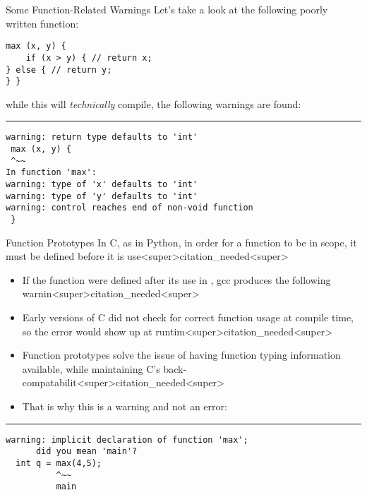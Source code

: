 \documentclass[11pt]{beamer}
\let\OldTexttt\texttt
\renewcommand{\texttt}[1]{\OldTexttt{\color{teal}{#1}}}
\begin{document}
\begin{frame}[fragile=singleslide]{Some Function-Related Warnings}
Let's take a look at the following poorly written function:
\begin{lstlisting}[style=C]
max (x, y) {
	if (x > y) { // return x;
} else { // return y; 
} }
\end{lstlisting}
while this will \emph{technically} compile, the following warnings are found:
\hrule\small
\begin{lstlisting}[style=terminal]
warning: return type defaults to 'int' 
 max (x, y) {
 ^~~
In function 'max':
warning: type of 'x' defaults to 'int' 
warning: type of 'y' defaults to 'int' 
warning: control reaches end of non-void function 
 }
\end{lstlisting}
\end{frame}

\begin{frame}[fragile=singleslide]{Function Prototypes}
In C, as in Python, in order for a function to be in scope, it must be defined before it is use<super>citation_needed<super>  
\begin{itemize}
\item If the function \texttt{max} were defined after its use in \texttt{main}, gcc produces the following warnin<super>citation_needed<super>
\item Early versions of C did not check for correct function usage at compile time, so the error would show up at runtim<super>citation_needed<super>
\item Function prototypes solve the issue of having function typing information available, while maintaining C's back-compatabilit<super>citation_needed<super>
\item That is why this is a warning and not an error:
\end{itemize}
\hrule
\begin{lstlisting}[style=terminal]
warning: implicit declaration of function 'max';
      did you mean 'main'? 
  int q = max(4,5);
          ^~~
          main
\end{lstlisting}
\end{frame}
\end{document}
